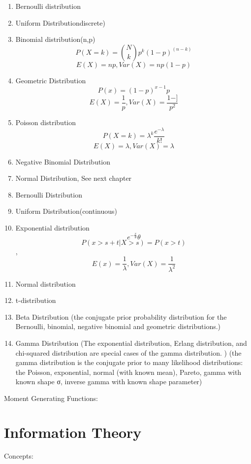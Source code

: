 \documentclass[11pt, openany]{book}              %
\begin{document}
\begin{enumerate}
	\item Bernoulli distribution
	\item Uniform Distributiondiscrete)
	\item Binomial distribution(n,p)$$P(X=k) = {N\choose k} p^k (1-p)^{(n-k)}$$ $$E(X) =np, Var(X) =np(1-p)$$
	\item Geometric Distribution $$P(x) = (1-p)^{x-1}p$$
	$$E(X) = \frac{1}{p}, Var(X) =\frac{1-]}{p^2}$$
	\item Poisson distribution $$P(X=k) = \lambda^k \frac{e^{-\lambda}}{k!}$$ $$E(X) = \lambda, Var(X) = \lambda$$
	\item Negative Binomial Distribution
	\item Normal Distribution, See next chapter
	\item Bernoulli Distribution 
	\item Uniform Distribution(continuous)
	\item Exponential distribution $$e^{-\frac{x}{\theta}}\theta$$ $$P(x>s+t|X>s) = P(x>t)$$, $$E(x) = \frac{1}{\lambda}, Var(X) = \frac{1}{\lambda^2}$$
	\item Normal distribution
	\item t-distribution
	\item Beta Distribution (the conjugate prior probability distribution for the Bernoulli, binomial, negative binomial and geometric distributions.)
	\item Gamma Distribution 
		\subitem (The exponential distribution, Erlang distribution, and chi-squared distribution are special cases of the gamma distribution. ) 
		\subitem (the gamma distribution is the conjugate prior to many likelihood distributions: the Poisson, exponential, normal (with known mean), Pareto, gamma with known shape σ, inverse gamma with known shape parameter)
\end{enumerate} 

Moment Generating Functions:

\section{Information Theory}

Concepts:
\end{document}
